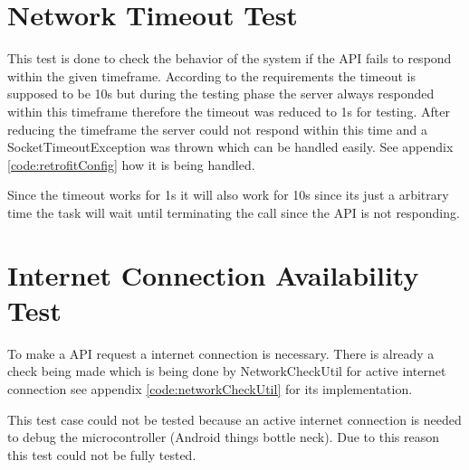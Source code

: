 \section{Network Timeout Test}
    This test is done to check the behavior of the system
    if the API fails to respond within the
    given timeframe. According to the requirements
    the timeout is supposed to be 10s but during the testing phase 
    the server always responded within this timeframe therefore the
    timeout was reduced to 1s for testing. After
    reducing the timeframe the server could not respond within this time 
    and a SocketTimeoutException was thrown which can be handled easily. See
    appendix
    \ref{code:retrofitConfig} how it is being handled. 

    Since the timeout works for 1s it will also work for 10s since its just a arbitrary
    time the task will wait until terminating the call since the API is not responding. 

\section{Internet Connection Availability Test}
    To make a API request a internet connection is necessary. There is 
    already a check being made which is being done by
    NetworkCheckUtil for active internet connection see appendix
    \ref{code:networkCheckUtil} for its implementation.

    This test case could not be tested because an active internet connection
    is needed to debug the microcontroller (Android things bottle neck). Due to this reason this test could not
    be fully tested.
    